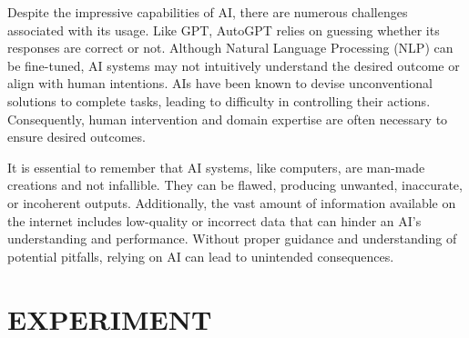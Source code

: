 \documentclass[letterpaper, 10pt, conference]{ieeeconf}
\begin{document}
        Despite the impressive capabilities of AI, there are numerous challenges associated with its usage. Like GPT, AutoGPT relies on guessing whether its responses are correct or not. Although Natural Language Processing (NLP) can be fine-tuned, AI systems may not intuitively understand the desired outcome or align with human intentions. AIs have been known to devise unconventional solutions to complete tasks, leading to difficulty in controlling their actions. Consequently, human intervention and domain expertise are often necessary to ensure desired outcomes\cite{miles2022}.
        
        It is essential to remember that AI systems, like computers, are man-made creations and not infallible. They can be flawed, producing unwanted, inaccurate, or incoherent outputs. Additionally, the vast amount of information available on the internet includes low-quality or incorrect data that can hinder an AI's understanding and performance. Without proper guidance and understanding of potential pitfalls, relying on AI can lead to unintended consequences.
        

    
    \section{EXPERIMENT}
    
\end{document}
